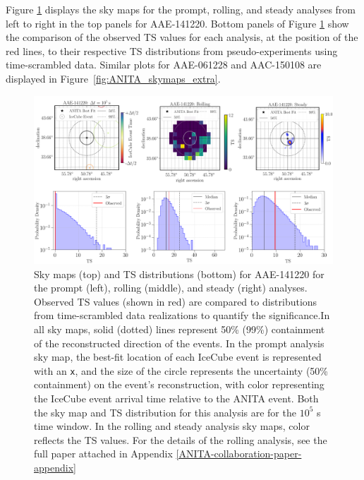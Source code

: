 Figure \ref{fig:ANITA_skymaps} displays the sky maps for the prompt, rolling, and steady analyses from left to right in the top panels for AAE-141220. Bottom panels of Figure \ref{fig:ANITA_skymaps} show the comparison of the observed TS values for each analysis, at the position of the red lines, to their respective TS distributions from pseudo-experiments using time-scrambled data. Similar plots for AAE-061228 and AAC-150108 are displayed in Figure~\ref{fig:ANITA_skymaps_extra}.

\begin{figure}[t!]
\centering
\vspace{0.0cm}
    \includegraphics[width=0.99\textwidth=]{figures/ANITA/AAE-141220_collab_paper_plots.pdf}
\caption[AAE-141220 Skymaps]{Sky maps (top) and TS distributions (bottom) for AAE-141220 for the prompt (left), rolling (middle), and steady (right) analyses. Observed TS values (shown in red) are compared to distributions from time-scrambled data realizations to quantify the significance.In all sky maps, solid (dotted) lines represent 50\% (99\%) containment of the reconstructed direction of the events. In the prompt analysis sky map, the best-fit location of each IceCube event is represented with an \texttt{x}, and the size of the circle represents the uncertainty (50\% containment) on the event's reconstruction, with color representing the IceCube event arrival time relative to the ANITA event. Both the sky map and TS distribution for this analysis are for the $10^5$ s time window. In the rolling and steady analysis sky maps, color reflects the TS values. For the details of the rolling analysis, see the full paper attached in Appendix \ref{ANITA-collaboration-paper-appendix}} \label{fig:ANITA_skymaps}
\end{figure}

